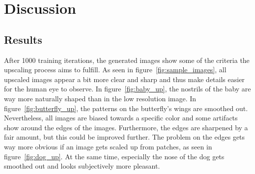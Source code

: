 \documentclass[11pt,twocolumn,twoside,paper=a4]{IEEEtran}
\begin{document}
\section*{Discussion}
\subsection{Results}
After 1000 training iterations, the generated images show some of the criteria the upscaling process aims to fulfill.
As seen in figure~\ref{fig:sample_images}, all upscaled images appear a bit more clear and sharp and thus make details easier for the human eye to observe.
In figure~\ref{fig:baby_up}, the nostrils of the baby are way more naturally shaped than in the low resolution image. 
In figure~\ref{fig:butterfly_up}, the patterns on the butterfly's wings are smoothed out. 
Nevertheless, all images are biased towards a specific color and some artifacts show around the edges of the images. 
Furthermore, the edges are sharpened by a fair amount, but this could be improved further.
The problem on the edges gets way more obvious if an image gets scaled up from patches, as seen in figure~\ref{fig:dog_up}. 
At the same time, especially the nose of the dog gets smoothed out and looks subjectively more pleasant.
\end{document}
